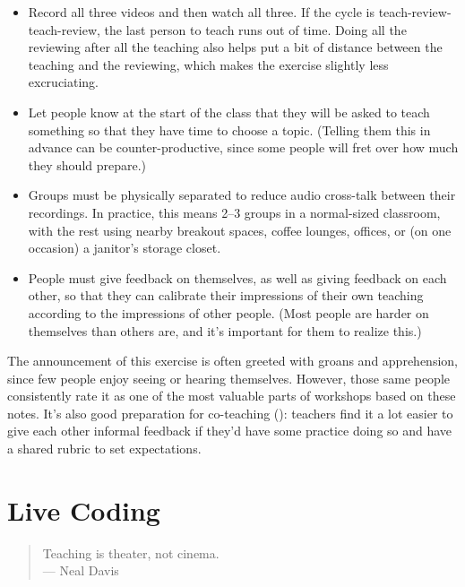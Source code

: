 \begin{itemize}

  \item
    Record all three videos and then watch all three.  If the cycle is
    teach-review-teach-review, the last person to teach runs out of
    time. Doing all the reviewing after all the teaching also helps
    put a bit of distance between the teaching and the reviewing,
    which makes the exercise slightly less excruciating.

  \item
    Let people know at the start of the class that they will be asked
    to teach something so that they have time to choose a topic.
    (Telling them this in advance can be counter-productive, since
    some people will fret over how much they should prepare.)

  \item
    Groups must be physically separated to reduce audio cross-talk
    between their recordings. In practice, this means 2--3 groups in a
    normal-sized classroom, with the rest using nearby breakout
    spaces, coffee lounges, offices, or (on one occasion) a janitor's
    storage closet.

  \item
    People must give feedback on themselves, as well as giving
    feedback on each other, so that they can calibrate their
    impressions of their own teaching according to the impressions of
    other people. (Most people are harder on themselves than others
    are, and it's important for them to realize this.)

\end{itemize}

The announcement of this exercise is often greeted with groans and
apprehension, since few people enjoy seeing or hearing themselves.
However, those same people consistently rate it as one of the most
valuable parts of workshops based on these notes.  It's also good
preparation for co-teaching (): teachers
find it a lot easier to give each other informal feedback if they'd
have some practice doing so and have a shared rubric to set
expectations.

\section{Live Coding}\label{s:performance-live}

\begin{quote}

  Teaching is theater, not cinema.\\
  --- Neal Davis

\end{quote}

